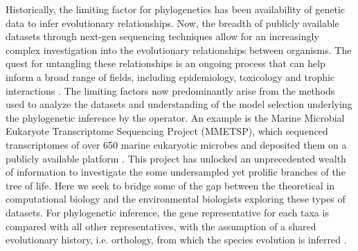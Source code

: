 \documentclass[12pt]{article}
\begin{document}
Historically, the limiting factor for phylogenetics has been availability of genetic data to infer evolutionary relationships.
Now, the breadth of publicly available datasets through next-gen sequencing techniques allow for an increasingly complex investigation into the evolutionary relationships between organisms. 
The quest for untangling these relationships is an ongoing process that can help inform a broad range of fields, including epidemiology, toxicology and trophic interactions \cite{mctavish2017and}. %
The limiting factors now predominantly arise from the methods used to analyze the datasets and understanding of the model selection underlying the phylogenetic inference by the operator.
An example is the Marine Microbial Eukaryote Transcriptome
Sequencing Project (MMETSP), which sequenced transcriptomes of over 650 marine eukaryotic microbes and deposited them on a publicly available platform \cite{keeling2014marine}. 
This project has unlocked an unprecedented wealth of information to investigate the some undersampled yet prolific branches of the tree of life.
Here we seek to bridge some of the gap between the theoretical in computational biology and the environmental biologists exploring these types of datasets.
For phylogenetic inference, the gene representative for each taxa is compared with all other representatives, with the assumption of a shared evolutionary history, i.e. orthology, from which the species evolution is inferred \cite{maddison1997gene}. 
\end{document}
